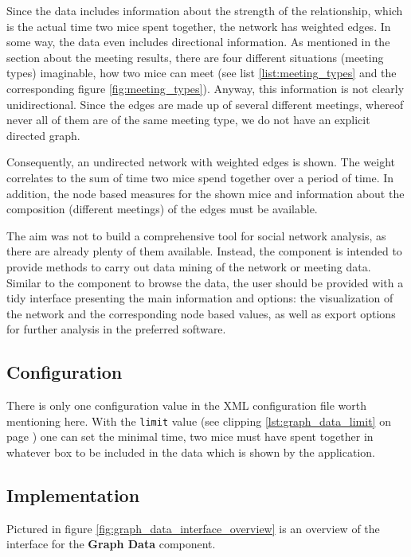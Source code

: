 Since the data includes information about the strength of the relationship, which is the actual time two mice spent together, the network has weighted edges. In some way, the data even includes directional information. As mentioned in the section about the meeting results, there are four different situations (meeting types) imaginable, how two mice can meet (see list \ref{list:meeting_types} and the corresponding figure \ref{fig:meeting_types}). Anyway, this information is not clearly unidirectional. Since the edges are made up of several different meetings, whereof never all of them are of the same meeting type, we do not have an explicit directed graph.

Consequently, an undirected network with weighted edges is shown. The weight correlates to the sum of time two mice spend together over a period of time. In addition, the node based measures for the shown mice and information about the composition (different meetings) of the edges must be available.

The aim was not to build a comprehensive tool for social network analysis, as there are already plenty of them available. Instead, the component is intended to provide methods to carry out data mining of the network or meeting data. Similar to the component to browse the data, the user should be provided with a tidy interface presenting the main information and options: the visualization of the network and the corresponding node based values, as well as export options for further analysis in the preferred software.

\subsection{Configuration}
\label{subsec:graph_config}

There is only one configuration value in the XML configuration file worth mentioning here. With the \lstinline|limit| value (see clipping \ref{lst:graph_data_limit} on page \pageref{lst:graph_data_limit}) one can set the minimal time, two mice must have spent together in whatever box to be included in the data which is shown by the application. 

\subsection{Implementation}
\label{subsec:graph_explore}

Pictured in figure \ref{fig:graph_data_interface_overview} is an overview of the interface for the \textbf{Graph Data} component. 

